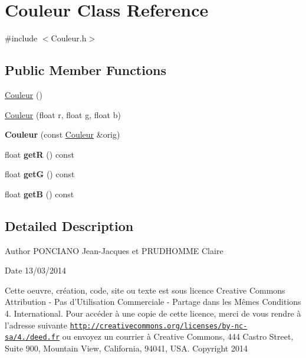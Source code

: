 \hypertarget{classCouleur}{\section{Couleur Class Reference}
\label{classCouleur}
}


{\ttfamily \#include $<$Couleur.\-h$>$}

\subsection*{Public Member Functions}
\begin{DoxyCompactItemize}
\item 
\hyperlink{classCouleur_a687a457edb08b51dbcd0299bb0b6a882}{Couleur} ()
\item 
\hyperlink{classCouleur_a1e16a48a6dbc76b76d47a516d5848a63}{Couleur} (float r, float g, float b)
\item 
\hypertarget{classCouleur_a3d1b0342753548700d886f85ab286616}{{\bfseries Couleur} (const \hyperlink{classCouleur}{Couleur} \&orig)}\label{classCouleur_a3d1b0342753548700d886f85ab286616}

\item 
\hypertarget{classCouleur_a5cf13a9fb92983ec10791860a4aaafa0}{float {\bfseries get\-R} () const }\label{classCouleur_a5cf13a9fb92983ec10791860a4aaafa0}

\item 
\hypertarget{classCouleur_a4dbd817480b34bb393cf99729642190f}{float {\bfseries get\-G} () const }\label{classCouleur_a4dbd817480b34bb393cf99729642190f}

\item 
\hypertarget{classCouleur_ae8445c1a512aafcb6624aa2f62150162}{float {\bfseries get\-B} () const }\label{classCouleur_ae8445c1a512aafcb6624aa2f62150162}

\end{DoxyCompactItemize}


\subsection{Detailed Description}
\begin{DoxyAuthor}{Author}
P\-O\-N\-C\-I\-A\-N\-O Jean-\/\-Jacques et P\-R\-U\-D\-H\-O\-M\-M\-E Claire 
\end{DoxyAuthor}
\begin{DoxyDate}{Date}
13/03/2014
\end{DoxyDate}
Cette oeuvre, création, code, site ou texte est sous licence Creative Commons Attribution -\/ Pas d’\-Utilisation Commerciale -\/ Partage dans les Mêmes Conditions 4. International. Pour accéder à une copie de cette licence, merci de vous rendre à l'adresse suivante \href{http://creativecommons.org/licenses/by-nc-sa/4.0/deed.fr}{\tt http\-://creativecommons.\-org/licenses/by-\/nc-\/sa/4./deed.\-fr} ou envoyez un courrier à Creative Commons, 444 Castro Street, Suite 900, Mountain View, California, 94041, U\-S\-A. Copyright 2014

